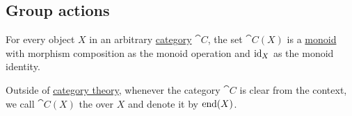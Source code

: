 \subsection{Group actions}\label{subsec:group_actions}

\begin{definition}\label{def:endomorphism_monoid}
  For every object \( X \) in an arbitrary \hyperref[def:category]{category} \( \cat{C} \), the set \( \cat{C}(X) \) is a \hyperref[def:monoid]{monoid} with morphism composition as the monoid operation and \( \operatorname{id}_X \) as the monoid identity.

  Outside of \hyperref[sec:category_theory]{category theory}, whenever the category \( \cat{C} \) is clear from the context, we call \( \cat{C}(X) \) the  over \( X \) and denote it by \( \operatorname{end}(X) \).
\end{definition}

